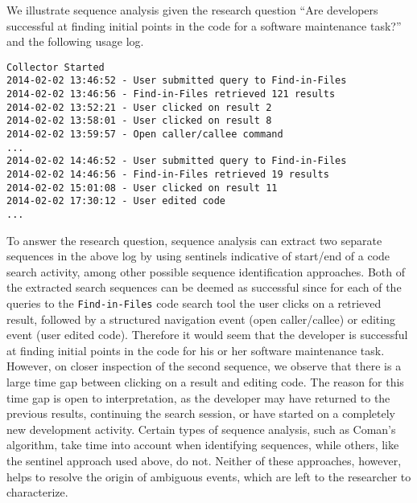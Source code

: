 We illustrate sequence analysis given the research question  ``Are developers successful at finding initial points in the code for a software maintenance task?'' and the following usage log.

\begin{verbatim}
Collector Started
2014-02-02 13:46:52 - User submitted query to Find-in-Files
2014-02-02 13:46:56 - Find-in-Files retrieved 121 results
2014-02-02 13:52:21 - User clicked on result 2
2014-02-02 13:58:01 - User clicked on result 8
2014-02-02 13:59:57 - Open caller/callee command 
...
2014-02-02 14:46:52 - User submitted query to Find-in-Files
2014-02-02 14:46:56 - Find-in-Files retrieved 19 results
2014-02-02 15:01:08 - User clicked on result 11
2014-02-02 17:30:12 - User edited code
...
\end{verbatim}

To answer the research question, sequence analysis can extract two separate sequences in the above log by using sentinels indicative of start/end of a code search activity, among other possible sequence identification approaches. Both of the extracted search sequences can be deemed as successful since for each of the queries to the {\tt Find-in-Files} code search tool the user clicks on a retrieved result, followed by a structured navigation event (open caller/callee) or editing event (user edited code). Therefore it would seem that the developer is successful at finding initial points in the code for his or her software maintenance task. However, on closer inspection of the second sequence, we observe that there is a large time gap between clicking on a result and editing code. The reason for this time gap is open to interpretation, as the developer may have returned to the previous results, continuing the search session, or have started on a completely new development activity. Certain types of sequence analysis, such as Coman's algorithm, take time into account when identifying sequences, while others, like the sentinel approach used above, do not. Neither of these approaches, however, helps to resolve the origin of ambiguous events, which are left to the researcher to characterize.




